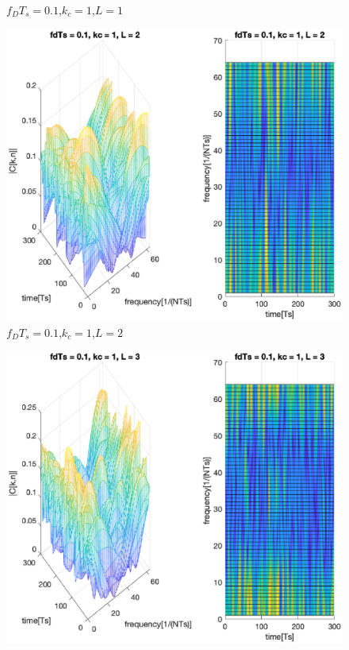 \documentclass[conference]{IEEEtran}
\begin{document}
\begin{appendices}
\begin{figure}[H]
        \caption{$f_{D}T_{s}=0.1$,$k_{c}=1$,$L=1$}
        \label{01_1_1}
    \end{figure}
    \begin{figure}[H]
        \centering
        \includegraphics[width=\linewidth]{Task2/01_1_2.eps}
        \caption{$f_{D}T_{s}=0.1$,$k_{c}=1$,$L=2$}
        \label{01_1_2}
    \end{figure}
    \begin{figure}[H]
        \centering
        \includegraphics[width=\linewidth]{Task2/01_1_3.eps}

\end{figure}
\end{appendices}
\end{document}
